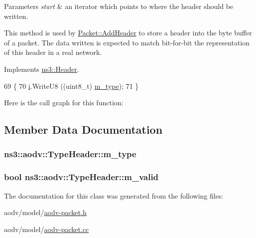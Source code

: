 \begin{DoxyParams}{Parameters}
{\em start} & an iterator which points to where the header should be written.\\
\hline
\end{DoxyParams}
This method is used by \hyperlink{classns3_1_1Packet_a465108c595a0bc592095cbcab1832ed8}{Packet\+::\+Add\+Header} to store a header into the byte buffer of a packet. The data written is expected to match bit-\/for-\/bit the representation of this header in a real network. 

Implements \hyperlink{classns3_1_1Header_afb61f1aac69ff8349a6bfe521fab5404}{ns3\+::\+Header}.


\begin{DoxyCode}
69 \{
70   \hyperlink{bernuolliDistribution_8m_a6f6ccfcf58b31cb6412107d9d5281426}{i}.WriteU8 ((uint8\_t) \hyperlink{classns3_1_1aodv_1_1TypeHeader_a8cb2683aebcf75c17f1aeb5565da0363}{m\_type});
71 \}
\end{DoxyCode}


Here is the call graph for this function\+:




\subsection{Member Data Documentation}
\subsubsection[{\texorpdfstring{m\+\_\+type}{m_type}}]{ ns3\+::aodv\+::\+Type\+Header\+::m\+\_\+type\hspace{0.3cm}{\ttfamily [private]}}\hypertarget{classns3_1_1aodv_1_1TypeHeader_a8cb2683aebcf75c17f1aeb5565da0363}{}\label{classns3_1_1aodv_1_1TypeHeader_a8cb2683aebcf75c17f1aeb5565da0363}
\subsubsection[{\texorpdfstring{m\+\_\+valid}{m_valid}}]{\setlength{\rightskip}{0pt plus 5cm}bool ns3\+::aodv\+::\+Type\+Header\+::m\+\_\+valid\hspace{0.3cm}{\ttfamily [private]}}\hypertarget{classns3_1_1aodv_1_1TypeHeader_a9ff813eb2be9301ea61d1843f7141348}{}\label{classns3_1_1aodv_1_1TypeHeader_a9ff813eb2be9301ea61d1843f7141348}


The documentation for this class was generated from the following files\+:\begin{DoxyCompactItemize}
\item 
aodv/model/\hyperlink{aodv-packet_8h}{aodv-\/packet.\+h}\item 
aodv/model/\hyperlink{aodv-packet_8cc}{aodv-\/packet.\+cc}\end{DoxyCompactItemize}
